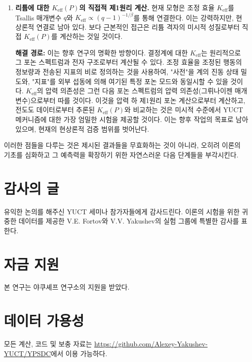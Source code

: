 \documentclass[11pt,a4paper]{article}
\newcommand{\Ke}{K_{\mathrm{eff}}}
\theoremstyle{remark}
\begin{document}
\begin{enumerate}
		\item \textbf{리튬에 대한 \(\Ke(P)\)의 직접적 제1원리 계산.} 현재 모형은 조정 효율 \(\Ke\)를 Tsallis 매개변수 \(q\)와 \(\Ke \propto (q-1)^{-1/\beta}\)를 통해 연결한다. 이는 강력하지만, 현상론적 연결로 남아 있다. 보다 근본적인 접근은 리튬 격자의 미시적 성질로부터 직접 \(\Ke(P)\)를 계산하는 것일 것이다.
		
		\textbf{해결 경로:} 이는 향후 연구의 명확한 방향이다. 결정계에 대한 \(\Ke\)는 원리적으로 그 포논 스펙트럼과 전자 구조로부터 계산될 수 있다. 조정 효율을 조정된 행동의 정보량과 전송된 지표의 비로 정의하는 것을 사용하여, "사전"을 계의 진동 상태 밀도와, "지표"를 외부 섭동에 의해 여기된 특정 포논 모드와 동일시할 수 있을 것이다. \(\Ke\)의 압력 의존성은 그런 다음 포논 스펙트럼의 압력 의존성(그뤼나이젠 매개변수)으로부터 따를 것이다. 이것을 압력 하 제1원리 포논 계산으로부터 계산하고, 전도도 데이터로부터 추론된 \(\Ke(P)\)와 비교하는 것은 미시적 수준에서 YUCT 메커니즘에 대한 가장 엄밀한 시험을 제공할 것이다. 이는 향후 작업의 목표로 남아 있으며, 현재의 현상론적 검증 범위를 벗어난다.
	\end{enumerate}
	이러한 점들을 다루는 것은 제시된 결과들을 무효화하는 것이 아니라, 오히려 이론의 기초를 심화하고 그 예측력을 확장하기 위한 자연스러운 다음 단계들을 부각시킨다.
	
	\section*{감사의 글}
	
	유익한 논의를 해주신 YUCT 세미나 참가자들에게 감사드린다. 이론의 시험을 위한 귀중한 데이터를 제공한 V.E. Fortov와 V.V. Yakushev의 실험 그룹에 특별한 감사를 표한다.
	
	\section*{자금 지원}
	
	본 연구는 야쿠셰프 연구소의 지원을 받았다.
	
	\section*{데이터 가용성}
	
	모든 계산, 코드 및 보충 자료는 \url{https://github.com/Alexey-Yakushev-YUCT/YPSDC}에서 이용 가능하다.
	
\end{document}
